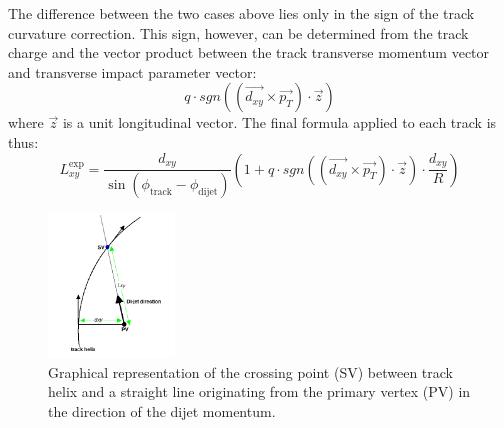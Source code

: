 \begin{enumerate}
\begin{itemize}
\end{itemize}
The difference between the two cases above lies only in the sign of the track curvature correction. This sign,
however,  can be
determined from the track charge and the vector product between the track transverse momentum vector and transverse
impact parameter vector:
\begin{equation}
q\cdot sgn\left(\left(\vec{d_{xy}}\times\vec{p_T}\right) \cdot \vec{z}\right)
\end{equation}   
where $\vec{z}$ is a unit longitudinal vector. The final formula applied to each track is thus:
\begin{equation}
 L_{xy}^\text{exp} = \frac{d_{xy}}{\sin\left(\phi_\text{track} - \phi_\text{dijet}\right)} \left(1 + q\cdot sgn\left(\left(\vec{d_{xy}}\times\vec{p_T}\right) \cdot \vec{z}\right) \cdot \frac{d_{xy}}{R}\right)
\label{eqn:lxy}
\end{equation}


\begin{figure}
\centering
\includegraphics[width=0.3\textwidth]{plots/guessLxy.png}
\caption{Graphical representation of the crossing point (SV) between track helix and a straight line originating from the primary vertex (PV) in the direction of the dijet momentum. \label{fig:guesslxydiagram}}
\end{figure} 


\end{enumerate}
